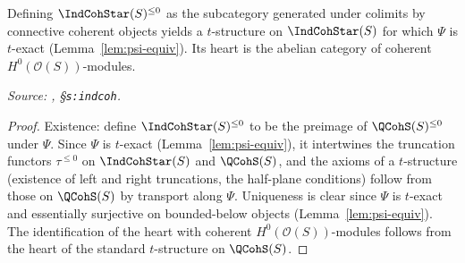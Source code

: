 \begin{proposition}
  \label{prop:indcoh-t-structure}
  Defining $\IndCohStar(S)^{\leq 0}$ as the subcategory generated under
  colimits by connective coherent objects yields a $t$-structure on
  $\IndCohStar(S)$ for which $\Psi$ is $t$-exact (Lemma~\ref{lem:psi-equiv}).
  Its heart is the abelian category of coherent $H^0(\mathcal{O}(S))$-modules.

  \textit{Source: \cite{hilburn-raskin}, \S\texttt{s:indcoh}.}
\end{proposition}

\begin{proof}
  Existence: define $\IndCohStar(S)^{\leq 0}$ to be the preimage of
  $\QCohS(S)^{\leq 0}$ under $\Psi$. Since $\Psi$ is $t$-exact
  (Lemma~\ref{lem:psi-equiv}), it intertwines the truncation functors
  $\tau^{\leq 0}$ on $\IndCohStar(S)$ and $\QCohS(S)$, and the axioms
  of a $t$-structure (existence of left and right truncations, the
  half-plane conditions) follow from those on $\QCohS(S)$ by transport
  along $\Psi$. Uniqueness is clear since $\Psi$ is $t$-exact and
  essentially surjective on bounded-below objects (Lemma~\ref{lem:psi-equiv}).
  The identification of the heart with coherent $H^0(\mathcal{O}(S))$-modules
  follows from the heart of the standard $t$-structure on $\QCohS(S)$.
\end{proof}

